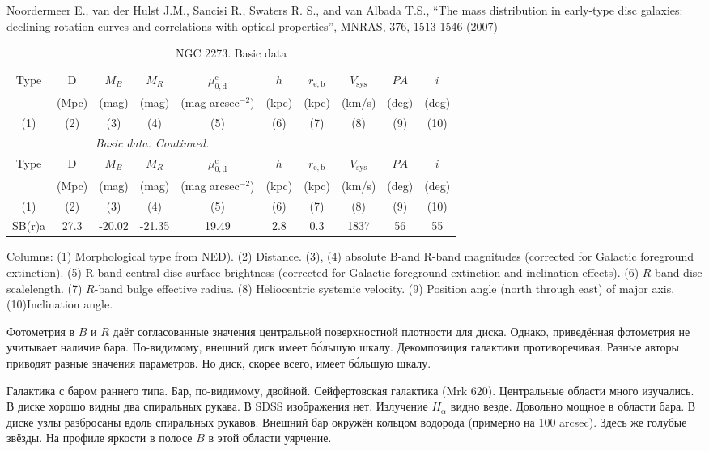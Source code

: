 \documentclass[english,10pt]{article}
\def\mm{\mathrm}
\begin{document}
\bigskip
\noindent
Noordermeer E., van der Hulst J.M., Sancisi R., 
Swaters R. S., and van Albada T.S., 
``The mass distribution in early-type disc galaxies: declining rotation
curves and correlations with optical properties'', 
MNRAS, 376, 1513-1546 (2007)

\begin{longtable}[c]{cccccccccc}
\caption{NGC 2273. Basic data}\label{GAL}  \\ 
\hline 
Type & D & $M_B$ & $M_R$ & $\mu_\mm{0,d}^\mm{c}$ & $h$ & $r_\mm{e,b}$
& $V_\mm{sys}$ & $PA$ & $i$ \\ 
& (Mpc) & (mag) & (mag) & (mag arcsec$^{-2}$) & (kpc) & (kpc)
& (km/s) & (deg) & (deg) \\
(1)&(2)&(3)&(4)&(5)&(6)&(7)&(8)&(9)&(10) \\ 
\hline
\endfirsthead 
\hline
\multicolumn{6}{c}{\small\slshape Basic data. 
Continued. } \\ \hline
Type & D & $M_B$ & $M_R$ & $\mu_\mm{0,d}^\mm{c}$ & $h$ & $r_\mm{e,b}$
& $V_\mm{sys}$ & $PA$ & $i$ \\ 
& (Mpc) & (mag) & (mag) & (mag arcsec$^{-2}$) & (kpc) & (kpc)
& (km/s) & (deg) & (deg) \\
(1)&(2)&(3)&(4)&(5)&(6)&(7)&(8)&(9)&(10) \\ 
\hline
\endhead 
\hline
SB(r)a & 27.3 & -20.02 & -21.35 & 19.49 & 2.8 & 0.3 
& 1837 & 56 & 55 \tabularnewline
\hline
\end{longtable}

Columns: 
(1) Morphological type from NED). 
(2) Distance. 
(3), (4) absolute B-and R-band magnitudes 
(corrected for Galactic foreground extinction).
(5) R-band central disc surface brightness 
(corrected for Galactic foreground extinction and inclination effects).
(6) $R$-band disc scalelength.
(7) $R$-band bulge effective radius.
(8) Heliocentric systemic velocity.
(9) Position angle (north through east) of major axis. 
(10)Inclination angle.

\bigskip
\noindent
Фотометрия в $B$ и $R$ даёт согласованные значения центральной 
поверхностной плотности для диска. Однако, приведённая фотометрия 
не учитывает наличие бара. По-видимому, внешний диск имеет 
б\'{о}льшую шкалу. Декомпозиция галактики противоречивая. Разные авторы 
приводят разные значения параметров. Но диск, скорее всего, имеет 
б\'{о}льшую шкалу.

\bigskip
\noindent
Галактика с баром раннего типа. Бар, по-видимому, двойной. 
Сейфертовская галактика (Mrk 620). Центральные области много изучались. 
В диске хорошо видны два спиральных рукава. В SDSS изображения нет. 
Излучение $H_\alpha$ видно везде. Довольно мощное в области бара. 
В диске узлы разбросаны вдоль спиральных рукавов. Внешний бар 
окружён кольцом водорода (примерно на 100 arcsec). Здесь же 
голубые звёзды. На профиле яркости в полосе $B$ в этой области 
уярчение.
\end{document}
